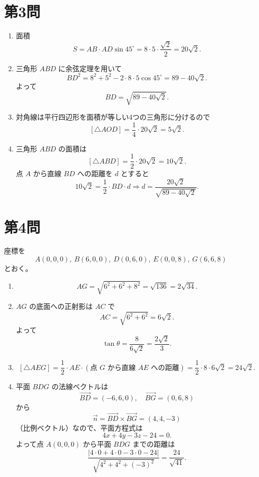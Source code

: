 \documentclass[a4paper,12pt]{ltjsarticle}
\begin{document}
\section*{第3問}
\begin{enumerate}[label=\arabic*.]
  \item 面積
  \[
  S=AB\cdot AD\sin45^\circ
  =8\cdot5\cdot\frac{\sqrt2}{2}
  =20\sqrt2.
  \]
  \item 三角形 \(ABD\) に余弦定理を用いて
  \[
  BD^2=8^2+5^2-2\cdot8\cdot5\cos45^\circ
  =89-40\sqrt2.
  \]
  よって
  \[
  BD=\sqrt{89-40\sqrt2}.
  \]
  \item 対角線は平行四辺形を面積が等しい4つの三角形に分けるので
  \[
  [\triangle AOD]=\frac14\cdot20\sqrt2=5\sqrt2.
  \]
  \item 三角形 \(ABD\) の面積は
  \[
  [\triangle ABD]=\frac12\cdot20\sqrt2=10\sqrt2.
  \]
  点 \(A\) から直線 \(BD\) への距離を \(d\) とすると
  \[
  10\sqrt2=\frac12\cdot BD\cdot d
  \Rightarrow d=\frac{20\sqrt2}{\sqrt{89-40\sqrt2}}.
  \]
\end{enumerate}

\section*{第4問}
座標を
\[
A(0,0,0),\ B(6,0,0),\ D(0,6,0),\ E(0,0,8),\ G(6,6,8)
\]
とおく。
\begin{enumerate}[label=\arabic*.]
  \item
  \[
  AG=\sqrt{6^2+6^2+8^2}=\sqrt{136}=2\sqrt{34}.
  \]
  \item \(AG\) の底面への正射影は \(AC\) で
  \[
  AC=\sqrt{6^2+6^2}=6\sqrt2.
  \]
  よって
  \[
  \tan\theta=\frac{8}{6\sqrt2}=\frac{2\sqrt2}{3}.
  \]
  \item
  \[
  [\triangle AEG]
  =\frac12\cdot AE\cdot(\text{点 }G\text{ から直線 }AE\text{ への距離})
  =\frac12\cdot8\cdot6\sqrt2
  =24\sqrt2.
  \]
  \item 平面 \(BDG\) の法線ベクトルは
  \[
  \overrightarrow{BD}=(-6,6,0),\quad \overrightarrow{BG}=(0,6,8)
  \]
  から
  \[
  \overrightarrow{n}=\overrightarrow{BD}\times\overrightarrow{BG}=(4,4,-3)
  \]
  （比例ベクトル）なので、平面方程式は
  \[
  4x+4y-3z-24=0.
  \]
  よって点 \(A(0,0,0)\) から平面 \(BDG\) までの距離は
  \[
  \frac{|4\cdot0+4\cdot0-3\cdot0-24|}{\sqrt{4^2+4^2+(-3)^2}}
  =\frac{24}{\sqrt{41}}.
  \]
\end{enumerate}
\end{document}
